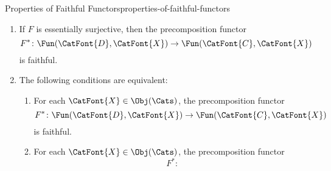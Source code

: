 \begin{proposition}{Properties of Faithful Functors}{properties-of-faithful-functors}
\begin{enumerate}
            \begin{enumerate}
                \item\label{properties-of-faithful-functors-interaction-with-precomposition-1-a}If $F$ is faithful, then the precomposition functor
                    \[
                        F^{*}
                        \colon
                        \Fun(\CatFont{D},\CatFont{X})
                        \to
                        \Fun(\CatFont{C},\CatFont{X})
                    \]%
                    \emph{can fail} to be faithful.
                \item\label{properties-of-faithful-functors-interaction-with-precomposition-1-b}Conversely, if the precomposition functor
                    \[
                        F^{*}
                        \colon
                        \Fun(\CatFont{D},\CatFont{X})
                        \to
                        \Fun(\CatFont{C},\CatFont{X})
                    \]%
                    is faithful, then $F$ \emph{can fail} to be faithful.
            \end{enumerate}
        \item\label{properties-of-faithful-functors-interaction-with-precomposition-2}If $F$ is essentially surjective, then the precomposition functor
            \[
                F^{*}
                \colon
                \Fun(\CatFont{D},\CatFont{X})
                \to
                \Fun(\CatFont{C},\CatFont{X})
            \]%
            is faithful.
        \item\label{properties-of-faithful-functors-interaction-with-precomposition-3}The following conditions are equivalent:
            \begin{enumerate}
                \item\label{properties-of-faithful-functors-interaction-with-precomposition-3-a}For each $\CatFont{X}\in\Obj(\Cats)$, the precomposition functor
                    \[
                        F^{*}
                        \colon
                        \Fun(\CatFont{D},\CatFont{X})
                        \to
                        \Fun(\CatFont{C},\CatFont{X})
                    \]%
                    is faithful.
                \item\label{properties-of-faithful-functors-interaction-with-precomposition-3-b}For each $\CatFont{X}\in\Obj(\Cats)$, the precomposition functor
                    \[
                        F^{*}
                        \colon
\]
\end{enumerate}
\end{enumerate}
\end{proposition}
